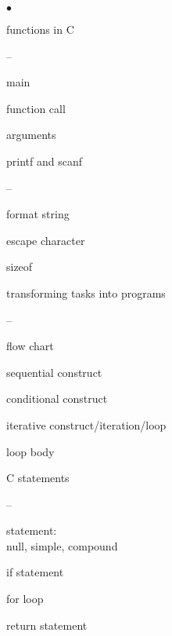 \begin{minipage}[t]{2.85in}
\begin{list}{$\bullet$}{\setlength{\itemsep}{0pt}\setlength{\parskip}{0pt}%
\setlength{\topsep}{0pt}\setlength{\partopsep}{0pt}\setlength{\parsep}{0pt}}
\item{functions in C
\begin{list}{--}{\setlength{\itemsep}{0pt}\setlength{\parskip}{0pt}%
\setlength{\topsep}{0pt}\setlength{\partopsep}{0pt}\setlength{\parsep}{0pt}}
\item {\tfix main}
\item function call
\item arguments
\item {{\tfix printf} and {\tfix scanf}
\begin{list}{--}{\setlength{\itemsep}{0pt}\setlength{\parskip}{0pt}%
\setlength{\topsep}{0pt}\setlength{\partopsep}{0pt}\setlength{\parsep}{0pt}}
\item format string
\item escape character
\end{list}
}
\item {\tfix sizeof} %
\end{list}
}

\item{transforming tasks into programs
\begin{list}{--}{\setlength{\itemsep}{0pt}\setlength{\parskip}{0pt}%
\setlength{\topsep}{0pt}\setlength{\partopsep}{0pt}\setlength{\parsep}{0pt}}
\item flow chart
\item sequential construct
\item conditional construct
\item iterative construct/iteration/loop
\item loop body
\end{list}
}

\item{C statements
\begin{list}{--}{\setlength{\itemsep}{0pt}\setlength{\parskip}{0pt}%
\setlength{\topsep}{0pt}\setlength{\partopsep}{0pt}\setlength{\parsep}{0pt}}
\item statement:\\ null, simple, compound
\item {\tfix if} statement
\item {\tfix for} loop
\item {\tfix return} statement
\end{list}
}


\end{list}
\end{minipage}
